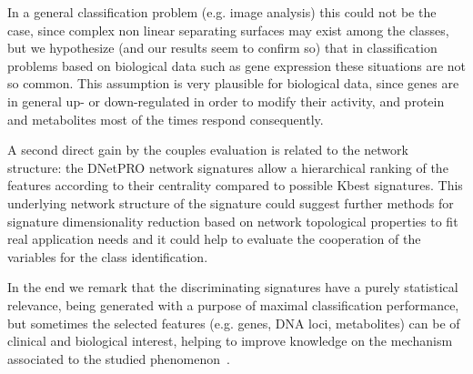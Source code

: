 \documentclass{standalone}
\begin{document}
In a general classification problem (e.g. image analysis) this could not be the case, since complex non linear separating surfaces may exist among the classes, but we hypothesize (and our results seem to confirm so) that in classification problems based on biological data such as gene expression these situations are not so common.
This assumption is very plausible for biological data, since genes are in general up- or down-regulated in order to modify their activity, and protein and metabolites most of the times respond consequently.

A second direct gain by the couples evaluation is related to the network structure: the DNetPRO network signatures allow a hierarchical ranking of the features according to their centrality compared to possible Kbest signatures.
This underlying network structure of the signature could suggest further methods for signature dimensionality reduction based on network topological properties to fit real application needs and it could help to evaluate the cooperation of the variables for the class identification.

In the end we remark that the discriminating signatures have a purely statistical relevance, being generated with a purpose of maximal classification performance, but sometimes the selected features (e.g. genes, DNA loci, metabolites) can be of clinical and biological interest, helping to improve knowledge on the mechanism associated to the studied phenomenon~\cite{PMrna, Scotlandi2009, PMgene, Terragna}.
\end{document}
